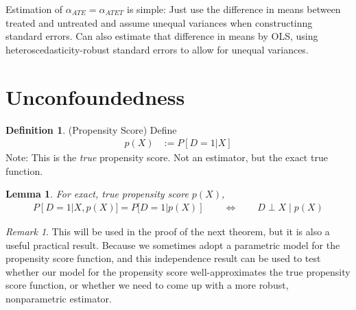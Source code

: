 \documentclass[12pt]{article}
\theoremstyle{plain}
\newtheorem{lem}[thm]{Lemma}
\theoremstyle{definition}
\newtheorem{defn}[thm]{Definition}
\theoremstyle{remark}
\newtheorem*{rmk}{Remark}
\begin{document}
Estimation of $\alpha_{ATE}=\alpha_{ATET}$ is simple:
Just use the difference in means between treated and untreated and
assume unequal variances when constructinng standard errors.
Can also estimate that difference in means by OLS, using
heteroscedasticity-robust standard errors to allow for unequal
variances.



\clearpage
\section{Unconfoundedness}


\begin{defn}
(Propensity Score)
Define
\begin{align*}
  p(X)
  &:=
  P[D=1|X]
\end{align*}
Note:
This is the \emph{true} propensity score.
Not an estimator, but the exact true function.
\end{defn}

\begin{lem}
For exact, true propensity score $p(X)$,
\begin{align*}
  P[D=1|X,p(X)]
  =
  P[D=1|p(X)]
  \qquad\iff\qquad
  D\perp X \;|\; p(X)
\end{align*}
\end{lem}
\begin{rmk}
This will be used in the proof of the next theorem, but it is also a
useful practical result.
Because we sometimes adopt a parametric model for the propensity score
function, and this independence result can be used to test whether our
model for the propensity score well-approximates the true propensity
score function, or whether we need to come up with a more robust,
nonparametric estimator.
\end{rmk}
\end{document}
